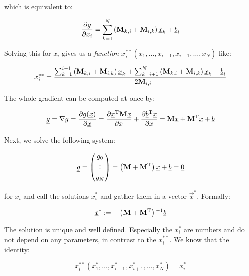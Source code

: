 \documentclass[a4paper,10pt]{article}
\begin{document}
which is equivalent to:

\begin{equation}
 \frac{\partial g}{\partial x_i} = \sum_{k=1}^N \left(\mathbf{M}_{k,i}+\mathbf{M}_{i,k}\right)\underline{x}_k + \underline{b}_i
\end{equation}

Solving this for $x_i$ gives us a \emph{function} $x_i^{**}(x_1, \ldots, x_{i-1}, x_{i+1}, \ldots, x_N)$ like:

\begin{equation}
 x_i^{**} = \frac{\sum_{k=1}^{i-1} \left(\mathbf{M}_{k,i}+\mathbf{M}_{i,k}\right)\underline{x}_k
                  + \sum_{k=i+1}^{N} \left(\mathbf{M}_{k,i}+\mathbf{M}_{i,k}\right)\underline{x}_k
                  + \underline{b}_i  }
                 {-2 \mathbf{M}_{i,i}}
\end{equation}

The whole gradient can be computed at once by:

\begin{equation}
 \underline{g} = \nabla g = \frac{\partial g(\underline{x})}{\partial \underline{x}}
         = \frac{\partial \underline{x}{}^{\textnormal{T}} \mathbf{M} \underline{x}}{\partial x} + \frac{\partial \underline{b}{}^{\textnormal{T}} \underline{x}}{\partial x}
         = \mathbf{M} \underline{x} + \mathbf{M}{}^{\textnormal{T}} \underline{x} + \underline{b}
\end{equation}

Next, we solve the following system:

\begin{equation}
 \underline{g} =
 \begin{pmatrix}
  g_0 \\ \vdots \\ g_N
 \end{pmatrix}
 = \left(\mathbf{M} + \mathbf{M}{}^{\textnormal{T}}\right) \underline{x} + \underline{b}
 = \underline{0}
\end{equation}

for $x_i$ and call the solutions $x_i^{*}$ and gather them in a vector $\vec{x}^{*}$.
Formally:

\begin{equation}
 \underline{x}^{*} := -\left(\mathbf{M} + \mathbf{M}{}^{\textnormal{T}}\right){}^{-1} \underline{b}
\end{equation}

The solution is unique and well defined. Especially the $x_i^{*}$ are numbers
and do not depend on any parameters, in contrast to the $x_i^{**}$.
We know that the identity:

\begin{equation} \label{eq:denest_sp}
 x_i^{**}(x_1^{*}, \ldots, x_{i-1}^{*}, x_{i+1}^{*}, \ldots, x_N^{*}) = x_i^{*}
\end{equation}
\end{document}
